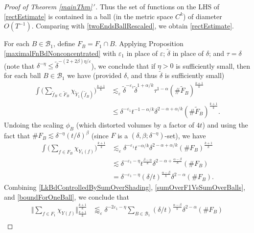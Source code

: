\documentclass[letterpaper, reqno,11pt]{article}
\numberwithin{equation}{section}
\newcommand{\eps}{\varepsilon}
\numberwithin{thm}{section}
\theoremstyle{remark}
\begin{document}
\begin{proof}[Proof of Theorem \ref{mainThm}\,$'$]
Thus the set of functions on the LHS of \eqref{rectEstimate} is contained in a ball (in the metric space $C^k$)  of diameter $O(T^{-1})$. Comparing with \eqref{twoEndsBallRescaled}, we obtain \eqref{rectEstimate}. 

For each $B\in\mathcal{B}_1$, define $F_B = F_1\cap B$. Applying Proposition \ref{maximalFnBdNonconcentrated} with $\eps_1$ in place of $\eps$; $\tilde\delta$ in place of $\delta$; and $\tau=\delta$ (note that $\delta^{-\eta}\leq\tilde\delta^{-(2+2\beta)\eta/\eps}$), we conclude that if $\eta>0$ is sufficiently small, then for each ball $B\in\mathcal{B}_1$ we have (provided $\delta$, and thus $\tilde\delta$ is sufficiently small)
\begin{equation*}
\begin{split}
\int\Big(  \sum_{\tilde f_B\in\tilde F_B}\chi_{\tilde Y_1(\tilde f_B)}\Big)^{\frac{k+1}{k}} 
& \lesssim_\eps \tilde\delta^{-\eps_1} \tilde\delta^{1+\alpha/k}\tau^{1-\alpha}(\#\tilde F_B)^{\frac{k+1}{k}} \\
& \leq \delta^{-\eps_1} t^{-1-\alpha/k} \delta^{2-\alpha+\alpha/k}(\#\tilde F_B)^{\frac{k+1}{k}}.
\end{split}
\end{equation*} 
Undoing the scaling $\phi_B$ (which distorted volumes by a factor of $4t$) and using the fact that $\#F_B\lesssim \delta^{-\eta}(t/\delta)^\beta$ (since $F$ is a $(\delta, \beta; \delta^{-\eta})$-set), we have
\begin{equation}\label{boundForOneBall}
\begin{split}
\int\Big(  \sum_{  f\in F_B}\chi_{ Y_1(f)}\Big)^{\frac{k+1}{k}} 
&\lesssim_\eps  \delta^{-\eps_1} t^{-\alpha/k} \delta^{2-\alpha+\alpha/k}(\# F_B)^{\frac{k+1}{k}}\\
&\lesssim  \delta^{-\eps_1-\eta} t^{\frac{\beta-\alpha}{k}} \delta^{2 - \alpha + \frac{\alpha-\beta}{k}}(\# F_B)\\
& = \delta^{-\eps_1-\eta} (\delta/ t)^{\frac{\alpha-\beta}{k}}\delta^{2 - \alpha}(\# F_B).
\end{split}
\end{equation}
Combining \eqref{LkBdControlledBySumOverShading}, \eqref{sumOverF1VsSumOverBalls}, and \eqref{boundForOneBall}, we conclude that
\begin{equation}\label{mainThmFinalProofIneq}
\begin{split}
\Big\Vert \sum_{f\in F_1} \chi_{Y(f)} \Big\Vert_{\frac{k+1}{k}}^{\frac{k+1}{k}}
 & \lessapprox_{\eps} \delta^{-2\eps_1-\eta} \sum_{B\in\mathcal{B}_1} (\delta/ t)^{\frac{\alpha-\beta}{k}}\delta^{2 - \alpha}(\# F_B)\\ 

\end{split}
\end{equation}
\end{proof}
\end{document}
